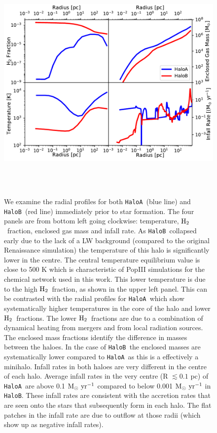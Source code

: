 \documentclass[twocolumn,iop,revtex4]{openjournal}
\newcommand{\msolaryr} {$\rm{M_{\odot}~yr^{-1}}~$}
\newcommand{\molH} {$\rm{H_2}$~}
\newcommand{\ha} {\texttt{HaloA~}}
\newcommand{\hb} {\texttt{HaloB~}}
\newcommand{\hbc} {\texttt{HaloB}}
\begin{document}
\begin{figure}
\centering
\begin{minipage}{175mm}      \begin{center}
\centerline{
    \includegraphics[width=18.0cm, height=12cm]{FIGURES/MultiPlot.pdf}}
\caption{We examine the radial profiles for both \ha (blue line) and \hb (red line) immediately prior to star formation. The four panels
  are from bottom left going clockwise: temperature, \molH fraction, enclosed gas mass and infall rate.
  As \hb collapsed early due to the lack of a LW background (compared to the original Renaissance simulation)
  the temperature of this halo is significantly lower in the centre. The central temperature equilibrium
  value is close to 500 K which is characteristic of PopIII simulations for the chemical network used in this work.
  This lower temperature is due to the high \molH fraction, as shown in the upper left panel. This can
  be contrasted with the radial profiles for \ha which show systematically higher temperatures in the core of the
  halo and lower \molH fractions. The lower \molH fractions are due to a combination of dynamical heating from
  mergers and from local radiation sources. The enclosed mass fractions identify the difference
  in masses between the haloes. In the case of \hb the enclosed masses are systematically lower compared
  to \ha as this is a effectively a minihalo. Infall rates in both haloes are very different in the
  centre of each halo. Average infall rates in the very centre (R $\lesssim 0.1$ pc) of \ha are
  above 0.1 \msolaryr compared to below 0.001 \msolaryr in \hbc. These infall rates are consistent
  with the accretion rates that are seen onto the stars that subsequently form in each halo. The flat
  patches in the infall rate are due to outflow at those radii
  (which show up as negative infall rates). }
\label{Fig:RadialProfiles}
\end{center} \end{minipage}
\end{figure}
\end{document}
